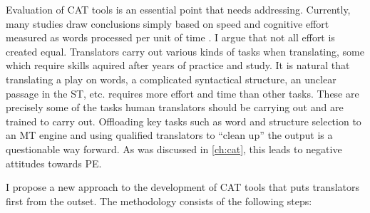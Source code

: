 Evaluation of \ac{CAT} tools is an essential point that needs addressing. Currently, many studies draw conclusions simply based on speed and cognitive effort measured as words processed per unit of time \parencite{carl2015post}. I argue that not all effort is created equal. Translators carry out various kinds of tasks when translating, some which require skills aquired after years of practice and study. It is natural that translating a play on words, a complicated syntactical structure, an unclear passage in the \ac{ST}, etc. requires more effort and time than other tasks. These are precisely some of the tasks human translators should be carrying out and are trained to carry out. Offloading key tasks such as word and structure selection to an \ac{MT} engine and using qualified translators to ``clean up'' the output is a questionable way forward. As was discussed in \autoref{ch:cat}, this leads to negative attitudes towards \ac{PE}.

I propose a new approach to the development of \ac{CAT} tools that puts translators first from the outset. The methodology consists of the following steps:

